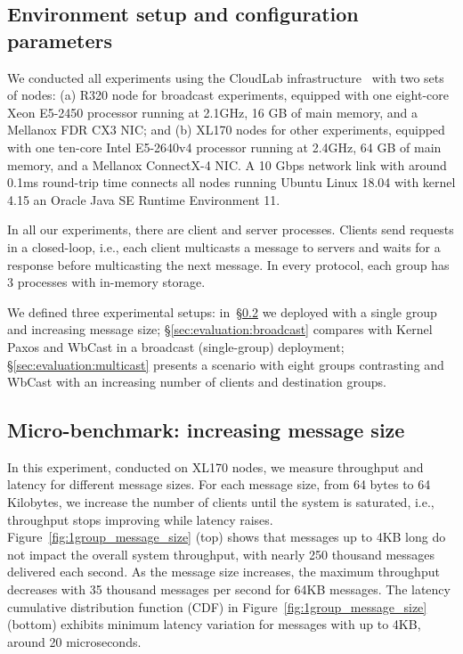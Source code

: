 \subsection{Environment setup and configuration parameters}
\label{sec:evaluation:setup}

We conducted all experiments using the CloudLab infrastructure~\cite{DuplyakinATC19cloudlab} with two sets of nodes: 
(a) R320 node for broadcast experiments, equipped with one eight-core Xeon E5-2450 processor running at 2.1GHz, 16 GB of main memory, and a Mellanox FDR CX3 NIC; and (b) XL170 nodes for other experiments, equipped with one ten-core Intel E5-2640v4 processor running at 2.4GHz, 64 GB of main memory, and a Mellanox ConnectX-4 NIC. 
A 10 Gbps network link with around 0.1ms round-trip time connects all nodes running Ubuntu Linux 18.04 with kernel 4.15 an Oracle Java SE Runtime Environment 11. 

In all our experiments, there are client and server processes. 
Clients send requests in a closed-loop, i.e., each client multicasts a message to servers and waits for a response before multicasting the next message. 
In every protocol, each group has 3 processes with in-memory storage.

We defined three experimental setups:
in~\S\ref{sec:evaluation:micro} we deployed \libname with a single group and increasing message size;
\S\ref{sec:evaluation:broadcast} compares \libname with Kernel Paxos and WbCast in a broadcast (single-group) deployment;
\S\ref{sec:evaluation:multicast} presents a scenario with eight groups contrasting \libname and WbCast with an increasing number of clients and destination groups.

\subsection{Micro-benchmark: increasing message size}
\label{sec:evaluation:micro}
In this experiment, conducted on XL170 nodes, we measure \libname throughput and latency for different message sizes.
For each message size, from 64 bytes to 64 Kilobytes, we increase the number of clients until the system is saturated, i.e., throughput stops improving while latency raises.
Figure~\ref{fig:1group_message_size} (top) shows that messages up to 4KB long do not impact the overall system throughput, with nearly 250 thousand messages delivered each second. 
As the message size increases, the maximum throughput decreases with 35 thousand messages per second for 64KB messages.
The latency cumulative distribution function (CDF) in Figure~\ref{fig:1group_message_size} (bottom) exhibits minimum latency variation for messages with up to 4KB, around 20 microseconds.

